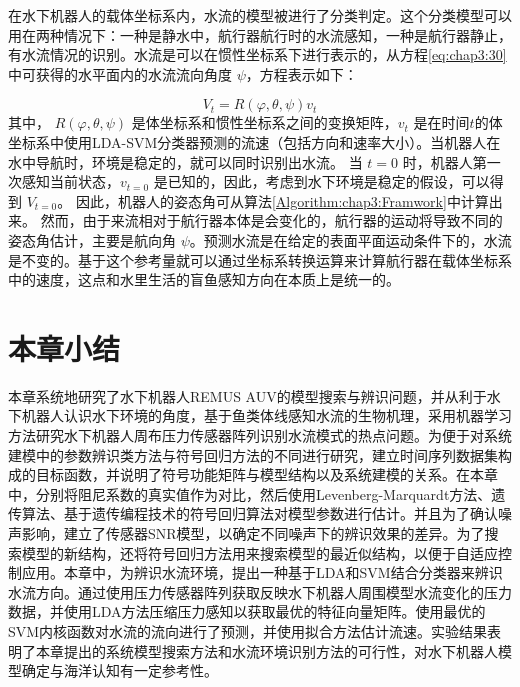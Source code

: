 在水下机器人的载体坐标系内，水流的模型被进行了分类判定。这个分类模型可以用在两种情况下：一种是静水中，航行器航行时的水流感知，一种是航行器静止，有水流情况的识别。水流是可以在惯性坐标系下进行表示的，从方程\ref{eq:chap3:30}中可获得的水平面内的水流流向角度 $\psi$，方程表示如下：

\begin{equation}
\label{eq:chap3:30}
V_t = R\left (  \varphi,\theta,\psi \right )v_t
\end{equation}
其中， $R\left ( \varphi,\theta,\psi \right )$ 是体坐标系和惯性坐标系之间的变换矩阵，$v_t$ 是在时间$t$的体坐标系中使用LDA-SVM分类器预测的流速（包括方向和速率大小）。当机器人在水中导航时，环境是稳定的，就可以同时识别出水流。 当 $t=0$ 时，机器人第一次感知当前状态，$v_{t=0}$ 是已知的，因此，考虑到水下环境是稳定的假设，可以得到 $V_{t=0}$。 因此，机器人的姿态角可从算法\ref{Algorithm:chap3:Framwork}中计算出来。 然而，由于来流相对于航行器本体是会变化的，航行器的运动将导致不同的姿态角估计，主要是航向角 $\psi$。预测水流是在给定的表面平面运动条件下的，水流是不变的。基于这个参考量就可以通过坐标系转换运算来计算航行器在载体坐标系中的速度，这点和水里生活的盲鱼感知方向在本质上是统一的。


\section{本章小结 }

本章系统地研究了水下机器人REMUS AUV的模型搜索与辨识问题，并从利于水下机器人认识水下环境的角度，基于鱼类体线感知水流的生物机理，采用机器学习方法研究水下机器人周布压力传感器阵列识别水流模式的热点问题。为便于对系统建模中的参数辨识类方法与符号回归方法的不同进行研究，建立时间序列数据集构成的目标函数，并说明了符号功能矩阵与模型结构以及系统建模的关系。在本章中，分别将阻尼系数的真实值作为对比，然后使用Levenberg-Marquardt方法、遗传算法、基于遗传编程技术的符号回归算法对模型参数进行估计。并且为了确认噪声影响，建立了传感器SNR模型，以确定不同噪声下的辨识效果的差异。为了搜索模型的新结构，还将符号回归方法用来搜索模型的最近似结构，以便于自适应控制应用。本章中，为辨识水流环境，提出一种基于LDA和SVM结合分类器来辨识水流方向。通过使用压力传感器阵列获取反映水下机器人周围模型水流变化的压力数据，并使用LDA方法压缩压力感知以获取最优的特征向量矩阵。使用最优的SVM内核函数对水流的流向进行了预测，并使用拟合方法估计流速。实验结果表明了本章提出的系统模型搜索方法和水流环境识别方法的可行性，对水下机器人模型确定与海洋认知有一定参考性。

